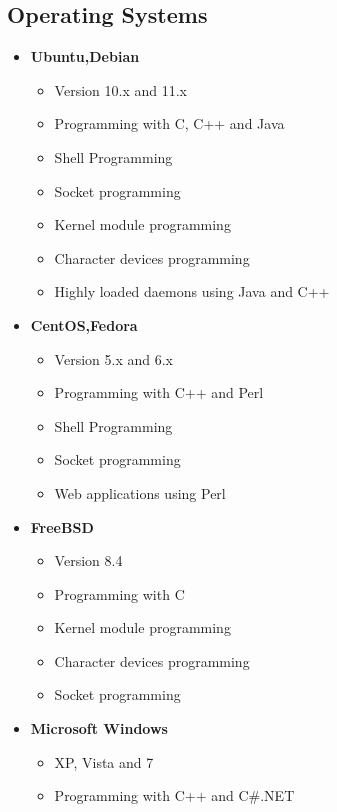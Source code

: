 \documentclass[12pt,a4paper]{article}
\begin{document}
	\subsection{Operating Systems}
		\begin{itemize}
			\item \textbf{Ubuntu,Debian}
				\begin{itemize}
					\item Version 10.x and 11.x
					\item Programming with C, C++ and Java
					\item Shell Programming
					\item Socket programming
					\item Kernel module programming
					\item Character devices programming
					\item Highly loaded daemons using Java and C++
				\end{itemize}
			\item \textbf{CentOS,Fedora}
				\begin{itemize}
					\item Version 5.x and 6.x
					\item Programming with C++ and Perl
					\item Shell Programming
					\item Socket programming
					\item Web applications using Perl
				\end{itemize}
			\item \textbf{FreeBSD}
				\begin{itemize}
					\item Version 8.4
					\item Programming with C
					\item Kernel module programming
					\item Character devices programming
					\item Socket programming
				\end{itemize}
			\item \textbf{Microsoft Windows}
				\begin{itemize}
					\item XP, Vista and 7
					\item Programming with C++ and C\#.NET
				\end{itemize}
		\end{itemize}
		
\end{document}
